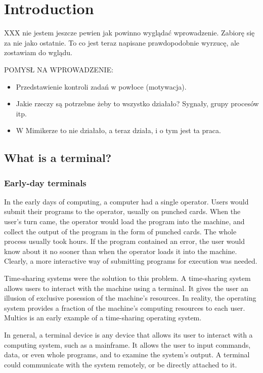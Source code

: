 \documentclass[shortabstract, manyadvisors, english, mgr]{iithesis}
\author{Jakub Piecuch}
\begin{document}
\chapter{Introduction}

XXX nie jestem jeszcze pewien jak powinno wyglądać wprowadzenie. Zabiorę się za
nie jako ostatnie. To co jest teraz napisane prawdopodobnie wyrzucę, ale
zostawiam do wglądu.

POMYSŁ NA WPROWADZENIE:
\begin{itemize}
\item Przedstawienie kontroli zadań w powłoce (motywacja).
\item Jakie rzeczy są potrzebne żeby to wszystko działało? Sygnały, grupy
  procesów itp.
\item W Mimikerze to nie działało, a teraz działa, i o tym jest ta praca.
\end{itemize}

\section{What is a terminal?}

\subsection{Early-day terminals}

In the early days of computing, a computer had a single operator. Users would
submit their programs to the operator, usually on punched cards. When the user's
turn came, the operator would load the program into the machine, and collect the
output of the program in the form of punched cards. The whole process usually
took hours. If the program contained an error, the user would know about it no
sooner than when the operator loads it into the machine. Clearly, a more
interactive way of submitting programs for execution was needed.

Time-sharing systems were the solution to this problem. A time-sharing system
allows users to interact with the machine using a terminal. It gives the user an
illusion of exclusive posession of the machine's resources. In reality, the
operating system provides a fraction of the machine's computing resources to
each user. Multics\cite{multics} is an early example of a time-sharing operating
system.

In general, a terminal device is any device that allows its user to interact
with a computing system, such as a mainframe. It allows the user to input
commands, data, or even whole programs, and to examine the system's output.
A terminal could communicate with the system remotely, or be directly attached
to it.
\end{document}
